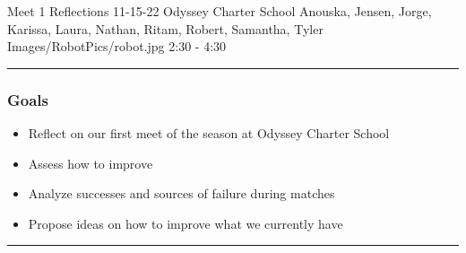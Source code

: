 \insertmeeting 
	{Meet 1 Reflections} 
	{11-15-22} 
	{Odyssey Charter School}
	{Anouska, Jensen, Jorge, Karissa, Laura, Nathan, Ritam, Robert, Samantha, Tyler}
	{Images/RobotPics/robot.jpg}
	{2:30 - 4:30}
	
\noindent\hfil\rule{\textwidth}{.4pt}\hfil
\subsubsection*{Goals}
\begin{itemize}
    \item Reflect on our first meet of the season at Odyssey Charter School
    \item Assess how to improve
    \item Analyze successes and sources of failure during matches
    \item Propose ideas on how to improve what we currently have

\end{itemize} 

\noindent\hfil\rule{\textwidth}{.4pt}\hfil

